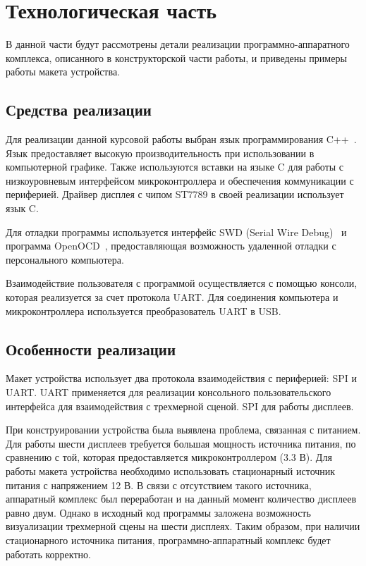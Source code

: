 \chapter{Технологическая часть}

В данной части будут рассмотрены детали реализации программно-аппаратного комплекса, описанного в конструкторской части работы, и приведены примеры работы макета устройства.

\section{Средства реализации}
Для реализации данной курсовой работы выбран язык программирования C++~\cite{cpp-lang}.
Язык предоставляет высокую производительность при использовании в компьютерной графике. Также используются вставки на языке C для работы с низкоуровневым интерфейсом микроконтроллера и обеспечения коммуникации с периферией. Драйвер дисплея с чипом ST7789 в своей реализации использует язык C. 

Для отладки программы используется интерфейс SWD (Serial Wire Debug)~\cite{swd} и программа OpenOCD~\cite{openocd}, предоставляющая возможность удаленной отладки с персонального компьютера. 

Взаимодействие пользователя с программой осуществляется с помощью консоли, которая реализуется за счет протокола UART. Для соединения компьютера и микроконтроллера используется преобразователь UART в USB.

\section{Особенности реализации}

Макет устройства использует два протокола взаимодействия с периферией: SPI и UART. UART применяется для реализации консольного пользовательского интерфейса для взаимодействия с трехмерной сценой. SPI для работы дисплеев.

При конструировании устройства была выявлена проблема, связанная с питанием. Для работы шести дисплеев требуется большая мощность источника питания, по сравнению с той, которая предоставляется микроконтроллером (3.3 В). Для работы макета устройства необходимо использовать стационарный источник питания с напряжением 12 В. В связи с отсутствием такого источника, аппаратный комплекс был переработан и на данный момент количество дисплеев равно двум. Однако в исходный код программы заложена возможность визуализации трехмерной сцены на шести дисплеях. Таким образом, при наличии стационарного источника питания, программно-аппаратный комплекс будет работать корректно. 


